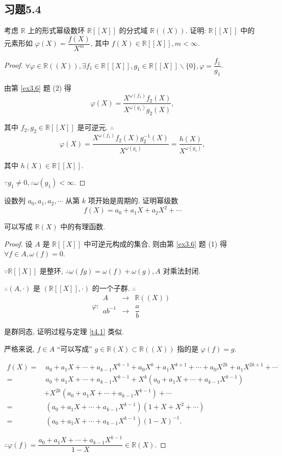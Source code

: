 \documentclass[color=black,device=normal,lang=cn,mode=geye]{elegantnote}
\begin{document}
\subsection{习题5.4}
\begin{exercise}%
    考虑 $\mathbb{R}$ 上的形式幂级数环 $\mathbb{R}[[X]]$ 的分式域 $\mathbb{R}((X))$. 证明: $\mathbb{R}[[X]]$ 中的元素形如 $\varphi(X)=\dfrac{f(X)}{X^m}$, 其中 $f(X)\in\mathbb{R}[[X]],m<\infty$.
\end{exercise}
\begin{proof}
    $\forall\varphi\in\mathbb{R}((X)),\exists f_1\in\mathbb{R}[[X]],g_1\in\mathbb{R}[[X]]\backslash\{0\},\varphi=\dfrac{f_1}{g_1}$.

    由第 \ref{ex3.6} 题 (2) 得
    \[\varphi(X)=\dfrac{X^{\omega(f_1)}f_2(X)}{X^{\omega(g_1)}g_2(X)},\]

    其中 $f_2,g_2\in\mathbb{R}[[X]]$ 是可逆元. $\therefore$
    \[\varphi(X)=\dfrac{X^{\omega(f_1)}f_2(X)g^{-1}_2(X)}{X^{\omega(g_1)}}=\dfrac{h(X)}{X^{\omega(g_1)}},\]

    其中 $h(X)\in\mathbb{R}[[X]]$.

    $\because g_1\neq0,\therefore\omega(g_1)<\infty$.
\end{proof}
\begin{exercise}%
    设数列 $a_0,a_1,a_2,\cdots$ 从第 $k$ 项开始是周期的. 证明幂级数
    \[f(X)=a_0+a_1X+a_2X^2+\cdots\]

    可以写成 $\mathbb{R}(X)$ 中的有理函数.
\end{exercise}
\begin{proof}
    设 $A$ 是 $\mathbb{R}[[X]]$ 中可逆元构成的集合, 则由第 \ref{ex3.6} 题 (1) 得 $\forall f\in A,\omega(f)=0$.

    $\because\mathbb{R}[[X]]$ 是整环, $\therefore\omega(fg)=\omega(f)+\omega(g),A$ 对乘法封闭.

    $\therefore(A,\cdot)$ 是 $(\mathbb{R}[[X]],\cdot)$ 的一个子群. $\therefore$
    \[\varphi:\begin{array}{rcl}
        A & \to & \mathbb{R}((X)) \\
        ab^{-1} & \to & \dfrac{a}{b}
    \end{array}\]

    是群同态, 证明过程与定理 \ref{t4.1} 类似.

    严格来说, $f\in A$ ``可以写成'' $g\in\mathbb{R}(X)\subset\mathbb{R}((X))$ 指的是 $\varphi(f)=g$.

    \begin{align*}
        f(X)= & \ a_0+a_1X+\cdots+a_{k-1}X^{k-1}+a_0X^k+a_1X^{k+1}+\cdots+a_0X^{2k}+a_1X^{2k+1}+\cdots \\
        = & \ a_0+a_1X+\cdots+a_{k-1}X^{k-1}+X^k(a_0+a_1X+\cdots+a_{k-1}X^{k-1}) \\
        & +X^{2k}(a_0+a_1X+\cdots+a_{k-1}X^{k-1})+\cdots \\
        = & \ (a_0+a_1X+\cdots+a_{k-1}X^{k-1})(1+X+X^2+\cdots) \\
        = & \ (a_0+a_1X+\cdots+a_{k-1}X^{k-1})(1-X)^{-1}.
    \end{align*}

    $\therefore\varphi(f)=\dfrac{a_0+a_1X+\cdots+a_{k-1}X^{k-1}}{1-X}\in\mathbb{R}(X)$.
\end{proof}
\end{document}
